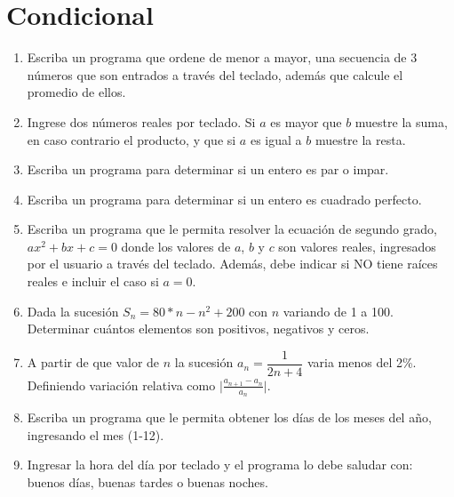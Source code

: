 \documentclass[11pt]{exam}
\begin{document}
\section{Condicional}
\begin{enumerate}

 \item 

Escriba un programa que ordene de menor a mayor, una secuencia de 3 n\'umeros que son 
entrados a trav\'es  del teclado, adem\'as que calcule el promedio de ellos.
\item 
 Ingrese dos n\'umeros reales por teclado. Si $a$ es mayor que $b$ muestre la suma, en caso contrario el producto, y que si $a$ es igual a $b$ muestre la resta. 
\item 
Escriba un programa para determinar si un  entero es par o impar. 
\item 
Escriba un programa para determinar si un  entero es cuadrado perfecto. 
\item
Escriba un programa que le permita resolver la ecuaci\'on de segundo grado, $ax^{2}+bx+c=0$ donde los valores
 de $a$, $b$ y $c$ son valores reales, ingresados por el usuario a trav\'es del teclado.  Adem\'as, debe indicar 
si NO tiene ra\'ices reales e incluir el caso si $a = 0$.
\item
 Dada la sucesi\'on $S_n=80*n-n^2+200$ con $n$ variando de 1 a 100. Determinar cu\'antos elementos son 
positivos, negativos  y ceros.
\item
A partir de que valor de $n$ la sucesi\'on $a_{n}=\dfrac{1}{2n+4}$ varia menos del  2\%. 
Definiendo variaci\'on relativa como $\vert\frac{a_{n+1}-a_{n}}{a_{n}}\vert$.
\item 
Escriba un programa que le permita obtener los d\'ias de los meses del a\~no, ingresando el mes (1-12).

\item Ingresar la hora del d\'ia por teclado y el programa lo debe saludar con: buenos d\'ias, buenas tardes o buenas noches.
\end{enumerate}
\end{document}
